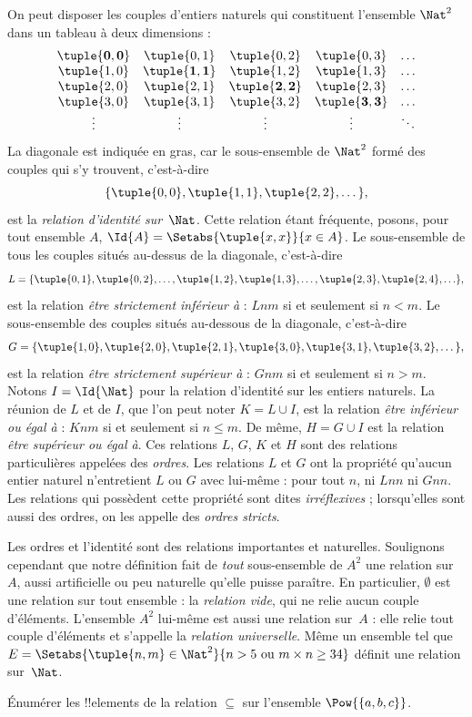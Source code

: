 \documentclass[../../../include/open-logic-section]{subfiles}
\begin{document}
\begin{ex}
On peut disposer les couples d'entiers naturels qui
constituent l'ensemble $\Nat^{2}$ dans un tableau à deux dimensions :
\[
  \begin{array}{ccccc}
  \mathbf{\tuple{ 0,0 }} & \tuple{ 0,1 } &
    \tuple{ 0,2 } & \tuple{ 0,3 } & \ldots\\
  \tuple{ 1,0 } & \mathbf{\tuple{ 1,1 }} &
    \tuple{ 1,2 } & \tuple{ 1,3 } & \ldots\\
  \tuple{ 2,0 } & \tuple{ 2,1 } &
    \mathbf{\tuple{ 2,2 }} & \tuple{ 2,3 } & \ldots\\
  \tuple{ 3,0 } & \tuple{ 3,1 } & \tuple{ 3,2 } &
    \mathbf{\tuple{ 3,3 }} & \ldots\\
  \vdots & \vdots & \vdots & \vdots & \mathbf{\ddots}
  \end{array}
\]
La diagonale est indiquée en gras, car le sous-ensemble de $\Nat^2$
formé des couples qui s'y trouvent, c'est-à-dire
\[
  \{\tuple{0,0 }, \tuple{ 1,1 }, \tuple{ 2,2 }, \dots\},
  \]
est la \emph{relation d'identité sur}~$\Nat$.
Cette relation étant fréquente, posons, pour tout ensemble $A$,
$\Id{A}=\Setabs{\tuple{ x,x }}{x \in A}$.
Le sous-ensemble de tous les couples situés au-dessus
de la diagonale, c'est-à-dire
\[
  L = \{\tuple{ 0,1 },\tuple{ 0,2 },\ldots,\tuple{ 1,2 },
  \tuple{ 1,3 }, \dots, \tuple{ 2,3 }, \tuple{ 2,4 },\ldots\},
\]
est la relation \emph{être strictement inférieur à} :
$Lnm$ si et seulement si $n<m$.
Le sous-ensemble des couples situés au-dessous
de la diagonale, c'est-à-dire
\[
  G=\{ \tuple{ 1,0 },\tuple{ 2,0 },\tuple{
    2,1 }, \tuple{ 3,0 },\tuple{ 3,1 },\tuple{ 3,2 }, \dots\},
\]
est la relation \emph{être strictement supérieur à} :
$Gnm$ si et seulement si $n>m$.
Notons $I=\Id{\Nat}$ pour la relation d'identité sur les entiers naturels.
%
%
%
La réunion de $L$ et de $I$, que l'on peut noter $K=L\cup I$,
est la relation \emph{être inférieur ou égal à} :
$Knm$ si et seulement si $n \le m$.
De même, $H=G \cup I$ est la relation
\emph{être supérieur ou égal à}.
Ces relations $L$, $G$, $K$ et $H$ sont des relations
particulières appelées des \emph{ordres}.
Les relations $L$ et $G$ ont la propriété qu'aucun entier naturel
n'entretient $L$ ou $G$ avec lui-même : pour tout $n$,
ni $Lnn$ ni $Gnn$.
Les relations qui possèdent cette propriété sont dites
\emph{irréflexives} ; lorsqu'elles sont aussi des ordres,
on les appelle des \emph{ordres stricts}.
\end{ex}

\begin{explain}
Les ordres et l'identité sont des relations importantes
et naturelles. Soulignons cependant que notre définition fait
de \emph{tout} sous-ensemble de $A^{2}$ une relation sur~$A$,
aussi artificielle ou peu naturelle qu'elle puisse paraître.
En particulier, $\emptyset$ est une relation sur tout ensemble :
la \emph{relation vide}, qui ne relie aucun couple d'éléments.
L'ensemble $A^{2}$ lui-même est aussi une relation sur~$A$ :
elle relie tout couple d'éléments et s'appelle la
\emph{relation universelle}. Même un ensemble tel que
$E=\Setabs{\tuple{n, m}\in\Nat^2}{n>5 \text{ ou } m \times n \ge 34}$
définit une relation sur~$\Nat$.
\end{explain}

\begin{prob}
  Énumérer les !!{element}s de la relation $\subseteq$
  sur l'ensemble $\Pow{\{a, b, c\}}$.
\end{prob}
\end{document}
